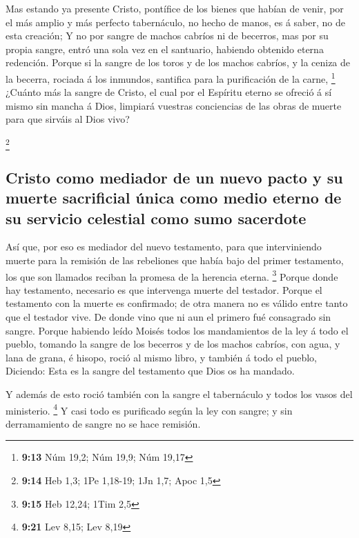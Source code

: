  Mas estando ya presente Cristo, pontífice de los bienes
que habían de venir, por el más amplio y más perfecto tabernáculo, no
hecho de manos, es á saber, no de esta creación;  Y no
por sangre de machos cabríos ni de becerros, mas por su propia sangre,
entró una sola vez en el santuario, habiendo obtenido eterna redención.
 Porque si la sangre de los toros y de los machos
cabríos, y la ceniza de la becerra, rociada á los inmundos, santifica
para la purificación de la carne, \footnote{\textbf{9:13} Núm 19,2; Núm
  19,9; Núm 19,17}  ¿Cuánto más la sangre de Cristo, el
cual por el Espíritu eterno se ofreció á sí mismo sin mancha á Dios,
limpiará vuestras conciencias de las obras de muerte para que sirváis al
Dios vivo?

\footnote{\textbf{9:14} Heb 1,3; 1Pe 1,18-19; 1Jn 1,7; Apoc 1,5}

\hypertarget{cristo-como-mediador-de-un-nuevo-pacto-y-su-muerte-sacrificial-uxfanica-como-medio-eterno-de-su-servicio-celestial-como-sumo-sacerdote}{%
\subsection{Cristo como mediador de un nuevo pacto y su muerte
sacrificial única como medio eterno de su servicio celestial como sumo
sacerdote}\label{cristo-como-mediador-de-un-nuevo-pacto-y-su-muerte-sacrificial-uxfanica-como-medio-eterno-de-su-servicio-celestial-como-sumo-sacerdote}}

 Así que, por eso es mediador del nuevo testamento, para
que interviniendo muerte para la remisión de las rebeliones que había
bajo del primer testamento, los que son llamados reciban la promesa de
la herencia eterna. \footnote{\textbf{9:15} Heb 12,24; 1Tim 2,5}
 Porque donde hay testamento, necesario es que intervenga
muerte del testador.  Porque el testamento con la muerte
es confirmado; de otra manera no es válido entre tanto que el testador
vive.  De donde vino que ni aun el primero fué consagrado
sin sangre.  Porque habiendo leído Moisés todos los
mandamientos de la ley á todo el pueblo, tomando la sangre de los
becerros y de los machos cabríos, con agua, y lana de grana, é hisopo,
roció al mismo libro, y también á todo el pueblo, 
Diciendo: Esta es la sangre del testamento que Dios os ha mandado.

 Y además de esto roció también con la sangre el
tabernáculo y todos los vasos del ministerio. \footnote{\textbf{9:21}
  Lev 8,15; Lev 8,19}  Y casi todo es purificado según la
ley con sangre; y sin derramamiento de sangre no se hace remisión.

